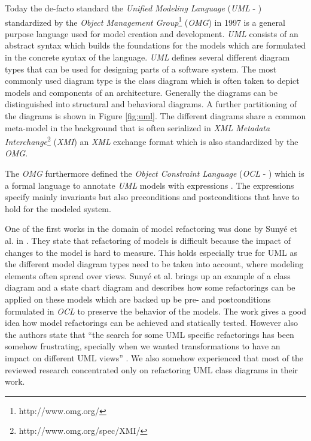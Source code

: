 \documentclass{llncs}
\begin{document}
Today the de-facto standard the \textit{Unified Modeling Language} (\textit{UML} - \cite{man:UML}) standardized by the \textit{Object Management Group}\footnote{http://www.omg.org/} (\textit{OMG}) in 1997 is a general purpose language used for model creation and development. \textit{UML} consists of an abstract syntax which builds the foundations for the models which are formulated in the concrete syntax of the language. \textit{UML} defines several different diagram types that can be used for designing parts of a software system. The most commonly used diagram type is the class diagram which is often taken to depict models and components of an architecture. Generally the diagrams can be distinguished into structural and behavioral diagrams. A further partitioning of the diagrams is shown in Figure \ref{fig:uml}. The different diagrams share a common meta-model in the background that is often serialized in \textit{XML Metadata Interchange}\footnote{http://www.omg.org/spec/XMI/} (\textit{XMI}) an \textit{XML} exchange format which is also standardized by the \textit{OMG}. 

The \textit{OMG} furthermore defined the \textit{Object Constraint Language} (\textit{OCL} - \cite{man:OCL}) which is a formal language to annotate \textit{UML} models with expressions \cite{man:OCL}. The expressions specify mainly invariants but also preconditions and postconditions that have to hold for the modeled system.

One of the first works in the domain of model refactoring was done by Suny{\'e} et al. in \cite{DBLP:conf/uml/SunyePTJ01}. They state that refactoring of models is difficult because the impact of changes to the model is hard to measure. This holds especially true for UML as the different model diagram types need to be taken into account, where modeling elements often spread over views. Suny{\'e} et al. brings up an example of a class diagram and a state chart diagram and describes how some refactorings can be applied on these models which are backed up be pre- and postconditions formulated in \textit{OCL} to preserve the behavior of the models. The work gives a good idea how model refactorings can be achieved and statically tested. However also the authors state that ``the search for some UML specific refactorings has been somehow frustrating, specially when we wanted transformations to have an impact on different UML views'' \cite{DBLP:conf/uml/SunyePTJ01}. We also somehow experienced that most of the reviewed research 
concentrated only on refactoring UML class diagrams in their work.
\end{document}

